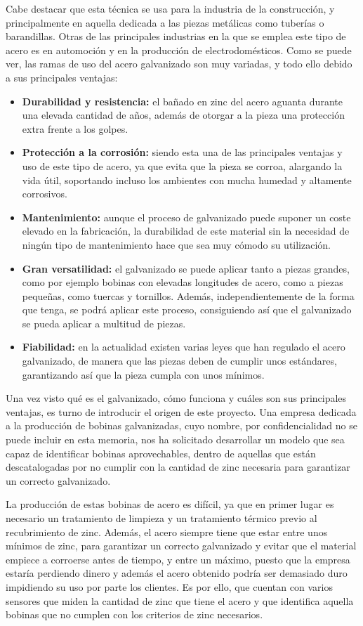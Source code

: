Cabe destacar que esta técnica se usa para la industria de la construcción, y principalmente en aquella dedicada a las piezas metálicas como tuberías o barandillas. Otras de las principales industrias en la que se emplea este tipo de acero es en automoción y en la producción de electrodomésticos. Como se puede ver, las ramas de uso del acero galvanizado son muy variadas, y todo ello debido a sus principales ventajas:
\begin{itemize}
    \item \textbf{Durabilidad y resistencia:} el bañado en zinc del acero aguanta durante una elevada cantidad de años, además de otorgar a la pieza una protección extra frente a los golpes.
    \item \textbf{Protección a la corrosión:} siendo esta una de las principales ventajas y uso de este tipo de acero, ya que evita que la pieza se corroa, alargando la vida útil, soportando incluso los ambientes con mucha humedad y altamente corrosivos.
    \item \textbf{Mantenimiento:} aunque el proceso de galvanizado puede suponer un coste elevado en la fabricación, la durabilidad de este material sin la necesidad de ningún tipo de mantenimiento hace que sea muy cómodo su utilización.
    \item \textbf{Gran versatilidad:} el galvanizado se puede aplicar tanto a piezas grandes, como por ejemplo bobinas con elevadas longitudes de acero, como a piezas pequeñas, como tuercas y tornillos. Además, independientemente de la forma que tenga, se podrá aplicar este proceso, consiguiendo así que el galvanizado se pueda aplicar a multitud de piezas.
    \item \textbf{Fiabilidad:} en la actualidad existen varias leyes que han regulado el acero galvanizado, de manera que las piezas deben de cumplir unos estándares, garantizando así que la pieza cumpla con unos mínimos.
\end{itemize}

Una vez visto qué es el galvanizado, cómo funciona y cuáles son sus principales ventajas, es turno de introducir el origen de este proyecto. Una empresa dedicada a la producción de bobinas galvanizadas, cuyo nombre, por confidencialidad no se puede incluir en esta memoria, nos ha solicitado desarrollar un modelo que sea capaz de identificar bobinas aprovechables, dentro de aquellas que están descatalogadas por no cumplir con la cantidad de zinc necesaria para garantizar un correcto galvanizado. 

La producción de estas bobinas de acero \cite{gonzalez2008desarrollo} es difícil, ya que en primer lugar es necesario un tratamiento de limpieza y un tratamiento térmico previo al recubrimiento de zinc. Además, el acero siempre tiene que estar entre unos mínimos de zinc, para garantizar un correcto galvanizado y evitar que el material empiece a corroerse antes de tiempo, y entre un máximo, puesto que la empresa estaría perdiendo dinero y además el acero obtenido podría ser demasiado duro impidiendo su uso por parte los clientes. Es por ello, que cuentan con varios sensores que miden la cantidad de zinc que tiene el acero y que identifica aquella bobinas que no cumplen con los criterios de zinc necesarios.

